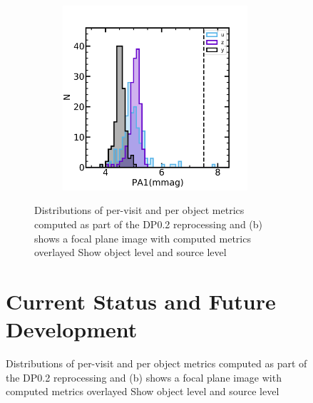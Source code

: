 \begin{figure}[!ht]
\begin{figure}[!htp]
\begin{subfigure}{.5\textwidth}
\end{subfigure}%
\begin{subfigure}{.5\textwidth}
    \includegraphics[width=0.98\textwidth]{figures/dp02_pa1_alltracts_uzy}
\end{subfigure}
\par\medskip %
\caption[short]{Distributions of per-visit and per object metrics computed as part of the DP0.2 reprocessing and (b) shows a focal plane image with computed metrics overlayed Show object level and source level }
\label{fig:faro_dp02_distr}
\end{figure}

\section{Current Status and Future Development} \label{sec:future}


\end{figure}
